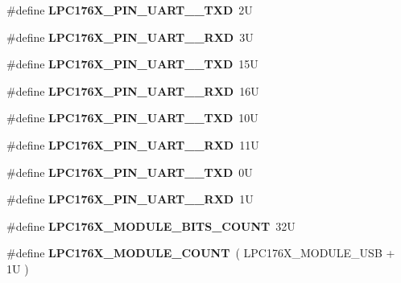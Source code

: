 \begin{DoxyCompactItemize}
\item 
\mbox{\label{io-defs_8h_a556185232a315f6ab84dd1468a4b901f}} 
\#define {\bfseries L\+P\+C176\+X\+\_\+\+P\+I\+N\+\_\+\+U\+A\+R\+T\+\_\+\_\+\+T\+XD}~2U
\item 
\mbox{\label{io-defs_8h_a72179bf5bf165b9fc2236fde598c23be}} 
\#define {\bfseries L\+P\+C176\+X\+\_\+\+P\+I\+N\+\_\+\+U\+A\+R\+T\+\_\+\_\+\+R\+XD}~3U
\item 
\mbox{\label{io-defs_8h_a04b86231de1159cedaf9f0b8dabc0a22}} 
\#define {\bfseries L\+P\+C176\+X\+\_\+\+P\+I\+N\+\_\+\+U\+A\+R\+T\+\_\+\_\+\+T\+XD}~15U
\item 
\mbox{\label{io-defs_8h_a931e1c1ab06f49aed97e6b5b5747840d}} 
\#define {\bfseries L\+P\+C176\+X\+\_\+\+P\+I\+N\+\_\+\+U\+A\+R\+T\+\_\+\_\+\+R\+XD}~16U
\item 
\mbox{\label{io-defs_8h_a8d98752f678e05c77b3fc3d395941d6c}} 
\#define {\bfseries L\+P\+C176\+X\+\_\+\+P\+I\+N\+\_\+\+U\+A\+R\+T\+\_\+\_\+\+T\+XD}~10U
\item 
\mbox{\label{io-defs_8h_acccc35c99291f0cc125181f48bd24012}} 
\#define {\bfseries L\+P\+C176\+X\+\_\+\+P\+I\+N\+\_\+\+U\+A\+R\+T\+\_\+\_\+\+R\+XD}~11U
\item 
\mbox{\label{io-defs_8h_a6548235d030a267517beca0e0e6b6e77}} 
\#define {\bfseries L\+P\+C176\+X\+\_\+\+P\+I\+N\+\_\+\+U\+A\+R\+T\+\_\+\_\+\+T\+XD}~0U
\item 
\mbox{\label{io-defs_8h_aae335abab806109cbbb7a1e9ca5929c8}} 
\#define {\bfseries L\+P\+C176\+X\+\_\+\+P\+I\+N\+\_\+\+U\+A\+R\+T\+\_\+\_\+\+R\+XD}~1U
\item 
\mbox{\label{io-defs_8h_acf6069de555b9553d631f48473e10342}} 
\#define {\bfseries L\+P\+C176\+X\+\_\+\+M\+O\+D\+U\+L\+E\+\_\+\+B\+I\+T\+S\+\_\+\+C\+O\+U\+NT}~32U
\item 
\mbox{\label{io-defs_8h_a09bd7d1e4d7af760845015cd997886c8}} 
\#define {\bfseries L\+P\+C176\+X\+\_\+\+M\+O\+D\+U\+L\+E\+\_\+\+C\+O\+U\+NT}~( L\+P\+C176\+X\+\_\+\+M\+O\+D\+U\+L\+E\+\_\+\+U\+SB + 1\+U )

\end{DoxyCompactItemize}
